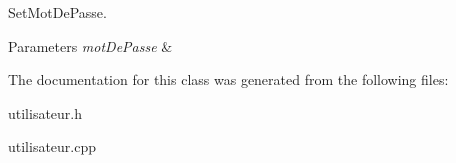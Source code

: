 Set\+Mot\+De\+Passe. 


\begin{DoxyParams}{Parameters}
{\em mot\+De\+Passe} & \\
\hline
\end{DoxyParams}


The documentation for this class was generated from the following files\+:\begin{DoxyCompactItemize}
\item 
utilisateur.\+h\item 
utilisateur.\+cpp\end{DoxyCompactItemize}
